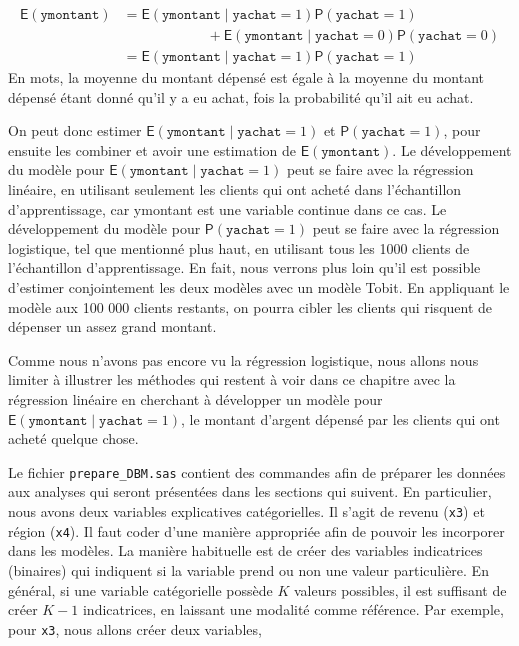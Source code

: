 \documentclass[
  11pt,
  letterpaper,
]{book}
\theoremstyle{definition}
\theoremstyle{definition}
\theoremstyle{definition}
\theoremstyle{remark}
\begin{document}
\begin{align*} 
{\mathsf E}\left(\texttt{ymontant}\right) &= {\mathsf E}\left(\texttt{ymontant} \mid \texttt{yachat}=1\right) {\mathsf P}\left(\texttt{yachat}=1\right) \\& \qquad \qquad \qquad +
{\mathsf E}\left(\texttt{ymontant} \mid \texttt{yachat}=0\right) {\mathsf P}\left(\texttt{yachat}=0\right) \\
 &= {\mathsf E}\left(\texttt{ymontant} \mid \texttt{yachat}=1\right) {\mathsf P}\left(\texttt{yachat}=1\right)
\end{align*}
En mots, la moyenne du montant dépensé est égale à la moyenne du montant dépensé étant donné qu'il y a eu achat, fois la probabilité qu'il ait eu achat.

On peut donc estimer \({\mathsf E}\left(\texttt{ymontant} \mid \texttt{yachat}=1\right)\) et \({\mathsf P}\left(\texttt{yachat}=1\right)\), pour ensuite les combiner et avoir une estimation de \({\mathsf E}\left(\texttt{ymontant}\right)\). Le développement du modèle pour \({\mathsf E}\left(\texttt{ymontant} \mid \texttt{yachat}=1\right)\) peut se faire avec la régression linéaire, en utilisant seulement les clients qui ont acheté dans l'échantillon d'apprentissage, car ymontant est une variable continue dans ce cas. Le développement du modèle pour \({\mathsf P}\left(\texttt{yachat}=1\right)\) peut se faire avec la régression logistique, tel que mentionné plus haut, en utilisant tous les 1000 clients de l'échantillon d'apprentissage. En fait, nous verrons plus loin qu'il est possible d'estimer conjointement les deux modèles avec un modèle Tobit. En appliquant le modèle aux 100 000 clients restants, on pourra cibler les clients qui risquent de dépenser un assez grand montant.

Comme nous n'avons pas encore vu la régression logistique, nous allons nous limiter à illustrer les méthodes qui restent à voir dans ce chapitre avec la régression linéaire en cherchant à développer un modèle pour \({\mathsf E}\left(\texttt{ymontant} \mid \texttt{yachat}=1\right)\), le montant d'argent dépensé par les clients qui ont acheté quelque chose.

Le fichier \texttt{prepare\_DBM.sas} contient des commandes afin de préparer les données aux analyses qui seront présentées dans les sections qui suivent. En particulier, nous avons deux variables explicatives catégorielles. Il s'agit de revenu (\texttt{x3}) et région (\texttt{x4}). Il faut coder d'une manière appropriée afin de pouvoir les incorporer dans les modèles. La manière habituelle est de créer des variables indicatrices (binaires) qui indiquent si la variable prend ou non une valeur particulière. En général, si une variable catégorielle possède \(K\) valeurs possibles, il est suffisant de créer \(K-1\) indicatrices, en laissant une modalité comme référence. Par exemple, pour \texttt{x3}, nous allons créer deux variables,
\end{document}
